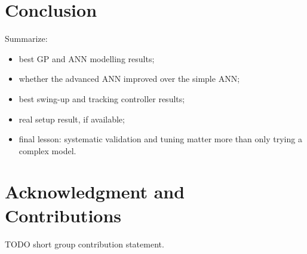 \documentclass[conference]{IEEEtran}
\begin{document}
\section{Conclusion}

Summarize:
\begin{itemize}
    \item best GP and ANN modelling results;
    \item whether the advanced ANN improved over the simple ANN;
    \item best swing-up and tracking controller results;
    \item real setup result, if available;
    \item final lesson: systematic validation and tuning matter more than only trying a complex model.
\end{itemize}

\section*{Acknowledgment and Contributions}

TODO short group contribution statement.



\end{document}
